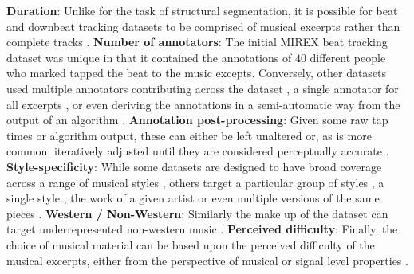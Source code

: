 \textbf{Duration}: Unlike for the task of structural segmentation, it is possible for beat and downbeat tracking datasets to be comprised of musical excerpts \cite{hainsworth04jasp,mckinney07jnmr,hockman12ismir, krebs13ismir} rather than complete tracks \cite{goto06ismir,Mauch2009a,digiorgi2016jaes,eremenko18ismir}. \textbf{Number of annotators}: The initial MIREX beat tracking dataset \cite{mckinney07jnmr} was unique in that it contained the annotations of $40$ different people who marked tapped the beat to the music excepts. Conversely, other datasets used multiple annotators contributing across the dataset \cite{holzapfel12taslp}, a single annotator for all excerpts \cite{hainsworth04jasp}, or even deriving the annotations in a semi-automatic way from the output of an algorithm \cite{Mauch2009a}. \textbf{Annotation post-processing}: Given some raw tap times or algorithm output, these can either be left unaltered \cite{mckinney07jnmr} or, as is more common, iteratively adjusted until they are considered perceptually accurate \cite{holzapfel12taslp, hainsworth04jasp, hockman12ismir}. \textbf{Style-specificity}: While some datasets are designed to have broad coverage across a range of musical styles \cite{goto06ismir,marchand15dafx,hainsworth04jasp}, others target a particular group of styles \cite{hockman12ismir,krebs13ismir}, a single style \cite{eremenko18ismir}, the work of a given artist \cite{Mauch2009a,digiorgi2016jaes} or even multiple versions of the same pieces \cite{sapp07ismir}. \textbf{Western / Non-Western}: Similarly the make up of the dataset can target underrepresented non-western music \cite{srinivasamurthy14icassp, srinivasamurthy14jnmr,nunes15ismir}. \textbf{Perceived difficulty}: Finally, the choice of musical material can be based upon the perceived difficulty of the musical excerpts, either from the perspective of musical or signal level properties \cite{holzapfel12taslp}. 
